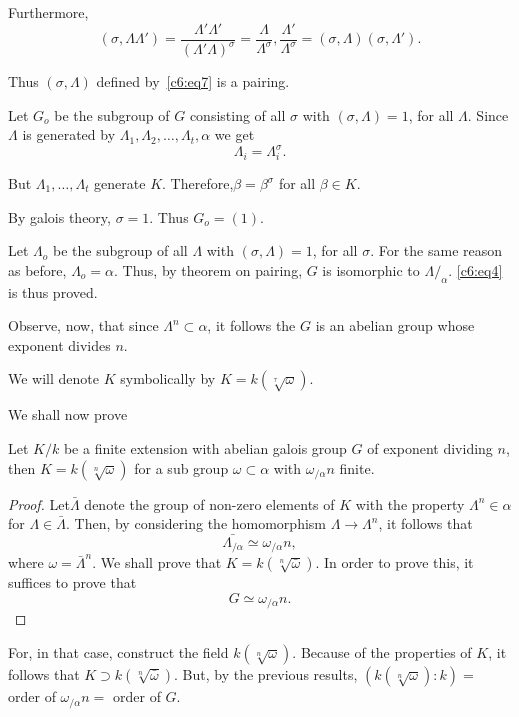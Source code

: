 Furthermore,
$$
(\sigma,\Lambda\Lambda')= 
\frac{\Lambda'\Lambda'}{(\Lambda'\Lambda)^{\sigma}} = 
\frac{\Lambda}{\Lambda^{\sigma}}, \frac{\Lambda'}{\Lambda^{\sigma}} =
(\sigma,\Lambda)(\sigma,\Lambda').   
$$

Thus $(\sigma,\Lambda)$ defined by~\eqref{c6:eq7} is a pairing. 

Let $G_o$ be the subgroup of $G$ consisting of all $\sigma$ with
$(\sigma,\Lambda) =1$, for all $\Lambda$. Since $\Lambda$ is generated
by $\Lambda_1, \Lambda_2, \ldots, \Lambda_t, \alpha$ we get  
$$
\Lambda_i=\Lambda^{\sigma}_i.
$$

But $\Lambda_1, \ldots,\Lambda_t$ generate $K$. Therefore,$\beta=
\beta^{\sigma}$ for all $\beta \in K$.  


By galois theory, $\sigma =1$. Thus $G_o=(1)$.

Let $\Lambda_o$ be the subgroup of all $\Lambda$ with
$(\sigma,\Lambda)=1$, for all $\sigma$. For the same reason as before,
$\Lambda_o= \alpha$. Thus, by theorem on pairing, $G$ is isomorphic to
$\Lambda/_{\alpha}$. \eqref{c6:eq4} is thus proved.  

Observe, now, that since $\Lambda^n \subset \alpha$, it follows the $G$ is
an abelian group whose exponent divides $n$. 

We will denote $K$ symbolically by $K=k(\sqrt[\tau]{\omega})$.

We shall now prove 

\begin{thm}\label{c6:thm13} %
Let $K/k$ be a finite extension with abelian galois group $G$ of
  exponent dividing $n$, then $K=k(\sqrt[n]{\omega})$ for a sub
  group $\omega \subset \alpha$ with $\omega_{/ \alpha}n$ finite. 
\end{thm}

\begin{proof} %
Let\pageoriginale $\bar{\Lambda}$ denote the group of non-zero
elements of $K$ with the property $\Lambda^n \in \alpha$ for $\Lambda
\in \bar{\Lambda}$. Then, by considering the homomorphism $\Lambda \to
\Lambda^n$, it follows that   
$$
\bar{\Lambda_{/\alpha}} \simeq \omega_{/\alpha} n,
$$
where $\omega = \bar{\Lambda}^n$. We shall prove that $K=
k(\sqrt[n]{\bar{\omega}})$. In order to prove this, it suffices to prove
that  
\begin{equation*}
G \simeq \omega_{/\alpha}n. \tag{8}\label{c6:eq8}
\end{equation*}
\end{proof}

For, in that case, construct the field
$k(\sqrt[n]{\omega})$. Because of the properties of $K$, it
follows that $K \supset k(\sqrt[n]{\bar{\omega}})$. But, by the
previous results, $(k(\sqrt[n]{\omega}):k)=$ order of
$\omega_{/\alpha} n=$ order of $G$. 

